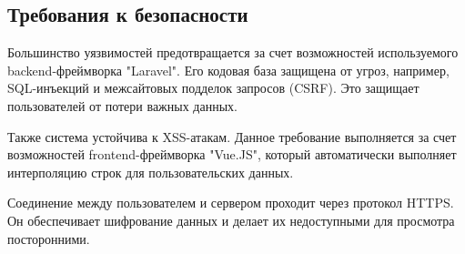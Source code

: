 \documentclass[other-needs.tex]{subfiles}
\begin{document}
\subsection{Требования к безопасности}
\par
Большинство уязвимостей предотвращается за счет возможностей используемого backend-фреймворка "Laravel".
Его кодовая база защищена от угроз, например, SQL-инъекций и межсайтовых подделок запросов (CSRF). 
Это защищает пользователей от потери важных данных.
\par
Также система устойчива к XSS-атакам. 
Данное требование выполняется за счет возможностей frontend-фреймворка "Vue.JS", 
который автоматически выполняет интерполяцию строк для пользовательских данных.
\par
Соединение между пользователем и сервером проходит через протокол HTTPS. 
Он обеспечивает шифрование данных и делает их недоступными для просмотра посторонними.
\end{document}
